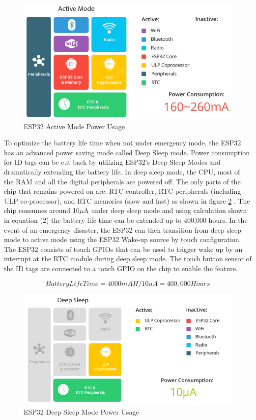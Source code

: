 \medskip
\begin{figure}[H]
\centering
    \includegraphics[scale=0.6]{./images/active_mode.png}
    \caption{ESP32 Active Mode Power Usage}
    \label{a_mode}
\end{figure}

\pagebreak
To optimize the battery life time when not under emergency mode, the ESP32 has an advanced power saving mode called Deep Sleep mode. Power consumption for ID tags can be cut back by utilizing ESP32’s Deep Sleep Modes and dramatically extending the battery life. In deep sleep mode, the CPU, most of the RAM and all the digital peripherals are powered off. The only parts of the chip that remains powered on are: RTC controller, RTC peripherals (including ULP co-processor), and RTC memories (slow and fast) as shown in figure \ref{ds_mode} \cite{R5-1-1}. The chip consumes around 10\(\mu\)A under deep sleep mode and using calculation shown in equation (2) the battery life time can be extended up to 400,000 hours. In the event of an emergency disaster, the ESP32 can then transition from deep sleep mode to active mode using the ESP32 Wake-up source by touch configuration. The ESP32 consists of touch GPIOs that can be used to trigger wake up by an interrupt at the RTC module during deep sleep mode. The touch button sensor of the ID tags are connected to a touch GPIO on the chip to enable the feature. 

\medskip
\begin{equation}
Battery Life Time = 4000mAH/10uA = 400,000 Hours
\end{equation}

\medskip
\begin{figure}[H]
\centering
    \includegraphics[scale=0.75]{./images/ds_mode.png}
    \caption{ESP32 Deep Sleep Mode Power Usage}
    \label{ds_mode}
\end{figure}


